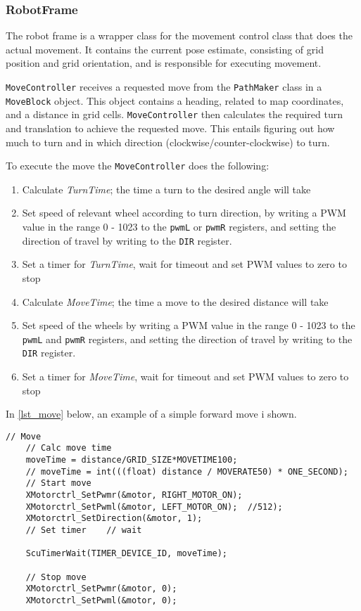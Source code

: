 \documentclass[Main]{subfiles}
\begin{document}
	\subsubsection{RobotFrame} %
	\label{subsub:software_robotframe}
	
	The robot frame is a wrapper class for the movement control class that does the actual movement.
	It contains the current pose estimate, consisting of grid position and grid orientation, and is responsible for executing movement.

	\texttt{MoveController} receives a requested move from the \texttt{PathMaker} class in a \texttt{MoveBlock} object.
	This object contains a heading, related to map coordinates, and a distance in grid cells.
	\texttt{MoveController} then calculates the required turn and translation to achieve the requested move.
	This entails figuring out how much to turn and in which direction (clockwise/counter-clockwise) to turn.

	To execute the move the \texttt{MoveController} does the following:
	\begin{enumerate}
		\item
		Calculate \emph{TurnTime}; the time a turn to the desired angle will take

		\item
		Set speed of relevant wheel according to turn direction, by writing a PWM value in the range 0 - 1023 to the \texttt{pwmL} or \texttt{pwmR} registers, and setting the direction of travel by writing to the \texttt{DIR} register.

		\item
		Set a timer for \emph{TurnTime}, wait for timeout and set PWM values to zero to stop

		\item
		Calculate \emph{MoveTime}; the time a move to the desired distance will take

		\item
		Set speed of the wheels by writing a PWM value in the range 0 - 1023 to the \texttt{pwmL} and \texttt{pwmR} registers, and setting the direction of travel by writing to the \texttt{DIR} register.

		\item
		Set a timer for \emph{MoveTime}, wait for timeout and set PWM values to zero to stop
	\end{enumerate}

	In \autoref{lst_move} below, an example of a simple forward move i shown.

	\begin{lstlisting}[caption=Example of simple forward movement, style=Code-C++, label=lst:move, basicstyle=\scriptsize]
	// Move
	// Calc move time
	moveTime = distance/GRID_SIZE*MOVETIME100;
	// moveTime = int(((float) distance / MOVERATE50) * ONE_SECOND);
	// Start move
	XMotorctrl_SetPwmr(&motor, RIGHT_MOTOR_ON);
	XMotorctrl_SetPwml(&motor, LEFT_MOTOR_ON);	//512);
	XMotorctrl_SetDirection(&motor, 1);
	// Set timer	// wait

	ScuTimerWait(TIMER_DEVICE_ID, moveTime);

	// Stop move
	XMotorctrl_SetPwmr(&motor, 0);
	XMotorctrl_SetPwml(&motor, 0);	
	\end{lstlisting}
	
\end{document}
